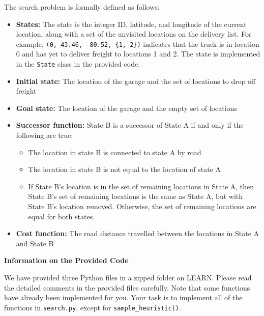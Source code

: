 \documentclass[12pt]{article}
\begin{document}
The search problem is formally defined as follows:

\begin{itemize}
    \item 
    \textbf{States:} The state is the integer ID, latitude, and longitude of the current location, along with a set of the unvisited locations on the delivery list. For example, \texttt{(0,~43.46,~-80.52,~\{1,~2\})} indicates that the truck is in location 0 and has yet to deliver freight to locations 1 and 2. The state is implemented in the \texttt{State} class in the provided code.
    \item
    \textbf{Initial state:} The location of the garage and the set of locations to drop off freight
    \item
    \textbf{Goal state:} The location of the garage and the empty set of locations
    \item
    \textbf{Successor function:} State B is a successor of State A if and only if the following are true:
    \begin{itemize}
        \item The location in state B is connected to state A by road
        \item The location in state B is not equal to the location of state A
        \item If State B's location is in the set of remaining locations in State A, then State B's set of remaining locations is the same as State A, but with State B's location removed. Otherwise, the set of remaining locations are equal for both states.
    \end{itemize}
    \item
    \textbf{Cost function:} The road distance travelled between the locations in State A and State B
\end{itemize}


{\bf Information on the Provided Code}

We have provided three Python files in a zipped folder on LEARN. Please read the detailed comments in the provided files carefully. Note that some functions have already been implemented for you. Your task is to implement all of the functions in \texttt{search.py}, except for \texttt{sample\_heuristic()}.
\end{document}
